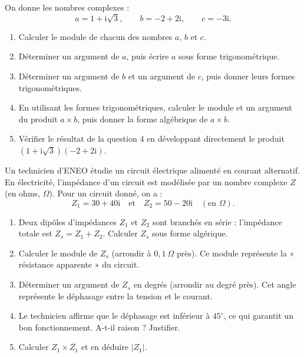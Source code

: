 \documentclass[11pt]{article}
\begin{document}
\begin{exercice}
On donne les nombres complexes :
\[ a = 1 + \mathrm{i}\sqrt{3}, \qquad b = -2 + 2\mathrm{i}, \qquad c = -3\mathrm{i}. \]
\begin{enumerate}
\item Calculer le module de chacun des nombres $a$, $b$ et $c$.
\item Déterminer un argument de $a$, puis écrire $a$ sous forme trigonométrique.
\item Déterminer un argument de $b$ et un argument de $c$, puis donner leurs formes trigonométriques.
\item En utilisant les formes trigonométriques, calculer le module et un argument du produit $a \times b$, puis donner la forme algébrique de $a \times b$.
\item Vérifier le résultat de la question 4 en développant directement le produit $(1+\mathrm{i}\sqrt{3})(-2+2\mathrm{i})$.
\end{enumerate}
\end{exercice}

\begin{exercice}
Un technicien d'ENEO étudie un circuit électrique alimenté en courant alternatif. En électricité, l'impédance d'un circuit est modélisée par un nombre complexe $Z$ (en ohms, $\Omega$). Pour un circuit donné, on a :
\[ Z_1 = 30 + 40\mathrm{i} \quad \text{et} \quad Z_2 = 50 - 20\mathrm{i} \quad (\text{en } \Omega). \]
\begin{enumerate}
\item Deux dipôles d'impédances $Z_1$ et $Z_2$ sont branchés en série : l'impédance totale est $Z_s = Z_1 + Z_2$. Calculer $Z_s$ sous forme algérique.
\item Calculer le module de $Z_s$ (arrondir à $0{,}1\ \Omega$ près). Ce module représente la « résistance apparente » du circuit.
\item Déterminer un argument de $Z_s$ en degrés (arrondir au degré près). Cet angle représente le déphasage entre la tension et le courant.
\item Le technicien affirme que le déphasage est inférieur à $45^\circ$, ce qui garantit un bon fonctionnement. A-t-il raison ? Justifier.
\item Calculer $Z_1 \times \overline{Z_1}$ et en déduire $|Z_1|$.
\end{enumerate}
\end{exercice}
\end{document}
